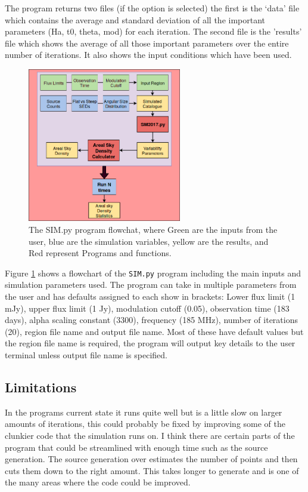 \documentclass[a4paper, 10pt]{article}
\begin{document}
The program returns two files (if the option is selected) the first is the `data' file which contains the average and standard deviation of all the important parameters (Ha, t0, theta, mod)  for each iteration. The second file is the 'results' file which shows the average of all those important parameters over the entire number of iterations. It also shows the input conditions which have been used.\\
\begin{figure}[H]
    \centering
    \includegraphics[width=0.6\textwidth]{SIM3(1).png}
    \caption{The SIM.py program flowchat, where Green are the inputs from the user, blue are the simulation variables, yellow are the results, and Red represent Programs and functions.}
    \label{fig:SIM}
\end{figure}

Figure \ref{fig:SIM} shows a flowchart of the \texttt{SIM.py} program including the main inputs and simulation parameters used. The program can take in multiple parameters from the user and has defaults assigned to each show in brackets: Lower flux limit (1 mJy), upper flux limit (1 Jy), modulation cutoff (0.05), observation time (183 days), alpha scaling constant (3300), frequency (185 MHz), number of iterations (20), region file name and output file name. Most of these have default values but the region file name is required, the program will output key details to the user terminal unless output file name is specified.


\subsection{Limitations}
In the programs current state it runs quite well but is a little slow on larger amounts of iterations, this could probably be fixed by improving some of the clunkier code that the simulation runs on. I think there are certain parts of the program that could be streamlined with enough time such as the source generation. The source generation over estimates the number of points and then cuts them down to the right amount. This takes longer to generate and is one of the many areas where the code could be improved.\\
\end{document}
